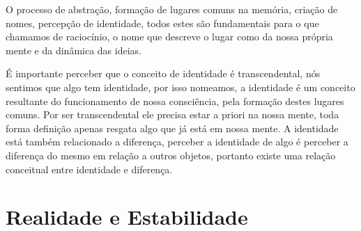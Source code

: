 \documentclass[10pt,a4paper]{report}
\begin{document}

\hspace{\baselineskip}

O processo de abstração, formação de lugares comuns na memória, criação de nomes, percepção de identidade, todos estes são fundamentais para o que chamamos de raciocínio, o nome que descreve o lugar como da nossa própria mente e da dinâmica das ideias. 

\hspace{\baselineskip}

É importante perceber que o conceito de identidade é transcendental, nós sentimos que algo tem identidade, por isso nomeamos, a identidade é um conceito resultante do funcionamento de nossa consciência, pela formação destes lugares comuns. Por ser transcendental ele precisa estar a priori na nossa mente, toda forma definição apenas resgata algo que já está em nossa mente. A identidade está também relacionado a diferença, perceber a identidade de algo é perceber a diferença do mesmo em relação a outros objetos, portanto existe uma relação conceitual entre identidade e diferença.





\section{Realidade e Estabilidade}

\hspace{\baselineskip}
\end{document}
